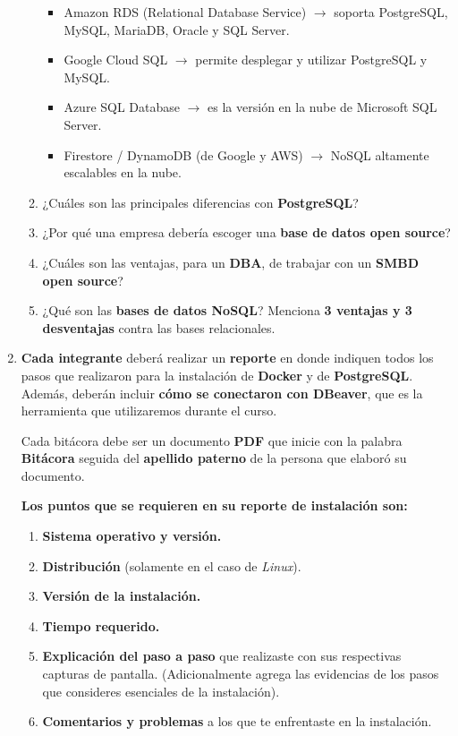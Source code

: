 \documentclass[12pt]{report}
\begin{document}
\begin{enumerate}[label=\roman*.]
\begin{enumerate}[label=\textbf{\arabic*.}, itemsep=2.0em]
\begin{itemize}
    \item Amazon RDS (Relational Database Service) $\rightarrow$ soporta PostgreSQL, MySQL, MariaDB, Oracle y SQL Server.
    \item Google Cloud SQL $\rightarrow$ permite desplegar y utilizar PostgreSQL y MySQL.
    \item Azure SQL Database $\rightarrow$ es la versión en la nube de Microsoft SQL Server.
    \item Firestore / DynamoDB (de Google y AWS) $\rightarrow$ NoSQL altamente escalables en la nube.
\end{itemize}
  \item ¿Cuáles son las principales diferencias con \textbf{PostgreSQL}?

  \item ¿Por qué una empresa debería escoger una \textbf{base de datos open source}?

  \item ¿Cuáles son las ventajas, para un \textbf{DBA}, de trabajar con un \textbf{SMBD open source}?

  \item ¿Qué son las \textbf{bases de datos NoSQL}? Menciona \textbf{3 ventajas y 3 desventajas} contra las bases relacionales.
\end{enumerate}

\bigskip




\item \textbf{Cada integrante} deberá realizar un \textbf{reporte} en donde indiquen todos los pasos que realizaron para la instalación de \textbf{Docker} y de \textbf{PostgreSQL}. Además, deberán incluir \textbf{cómo se conectaron con DBeaver}, que es la herramienta que utilizaremos durante el curso. 

Cada bitácora debe ser un documento \textbf{PDF} que inicie con la palabra \textbf{Bitácora} seguida del \textbf{apellido paterno} de la persona que elaboró su documento.

\medskip

\textbf{Los puntos que se requieren en su reporte de instalación son:}

\begin{enumerate}[label=\textbf{\arabic*.}, leftmargin=*, itemsep=0.8em]
  \item \textbf{Sistema operativo y versión.}
  \item \textbf{Distribución} (solamente en el caso de \textit{Linux}).
  \item \textbf{Versión de la instalación.}
  \item \textbf{Tiempo requerido.}
  \item \textbf{Explicación del paso a paso} que realizaste con sus respectivas capturas de pantalla. (Adicionalmente agrega las evidencias de los pasos que consideres esenciales de la instalación).
  \item \textbf{Comentarios y problemas} a los que te enfrentaste en la instalación.
\end{enumerate}


\end{enumerate}
\end{document}
